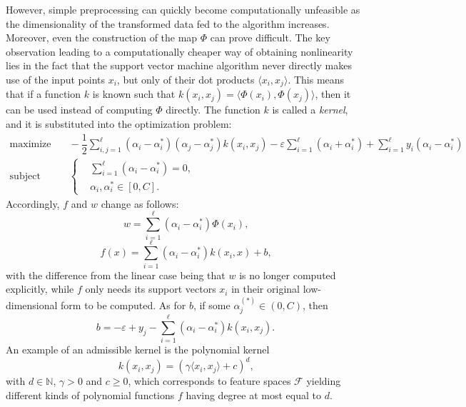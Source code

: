 \documentclass[12pt]{report}
\begin{document}
However, simple preprocessing can quickly become computationally unfeasible as the dimensionality of the transformed data fed to the algorithm increases. Moreover, even the construction of the map $\Phi$ can prove difficult. The key observation leading to a computationally cheaper way of obtaining nonlinearity lies in the fact that the support vector machine algorithm never directly makes use of the input points $ x_{i} $, but only of their dot products $ \langle x_{i},x_{j} \rangle $. This means that if a function $ k $ is known such that $ k(x_{i},x_{j}) = \langle\Phi (x_{i}),\Phi (x_{j})\rangle $, then it can be used instead of computing $ \Phi $ directly. The function $ k $ is called a \textit{kernel}, and it is substituted into the optimization problem:
\begin{equation} \label{kernelsmargdual}
\begin{split}
\text{maximize} &\quad
-\dfrac{1}{2}\sum_{i,j=1}^{\ell}(\alpha_{i} - \alpha_{i}^{*})(\alpha_{j} - \alpha_{j}^{*})k(x_{i},x_{j}) -\varepsilon\sum_{i=1}^{\ell}(\alpha_{i} + \alpha_{i}^{*}) + \sum_{i=1}^{\ell}y_{i}(\alpha_{i}-\alpha_{i}^{*}) \\
\text{subject to} &\quad \left\{\begin{split}
&\sum_{i=1}^{\ell}(\alpha_{i} - \alpha_{i}^{*}) = 0 \text{,}\\
&\alpha_{i},\alpha_{i}^{*} \in [0,C] \text{.}
\end{split}\right.
\end{split}
\end{equation}
Accordingly, $ f $ and $ w $ change as follows:
\begin{equation} \label{wnonlinear}
w = \sum_{i=1}^{\ell}(\alpha_{i}-\alpha_{i}^{*})\Phi(x_{i}) \text{,}
\end{equation}
\begin{equation} \label{kernelfsvexp}
f(x) = \sum_{i=1}^{\ell}(\alpha_{i}-\alpha_{i}^{*})k(x_{i},x) + b \text{,}
\end{equation}
with the difference from the linear case being that $ w $ is no longer computed explicitly, while $ f $ only needs its support vectors $ x_{i} $ in their original low-dimensional form to be computed. As for $b$, if some $\alpha_{j}^{(*)} \in (0,C)$, then
\begin{equation} \label{nonlincompb3}
b = - \varepsilon + y_{j} - \sum_{i=1}^{\ell}(\alpha_{i}-\alpha_{i}^{*})k(x_{i},x_{j}) \text{.}
\end{equation}
An example of an admissible kernel is the polynomial kernel
\begin{equation} \label{polykernel}
k(x_{i},x_{j}) = (\gamma\langle x_{i},x_{j} \rangle + c)^{d} \text{,}
\end{equation}
with $ d \in \mathbb{N} $, $ \gamma > 0 $ and $ c \geq 0 $, which corresponds to feature spaces $ \mathcal{F} $ yielding different kinds of polynomial functions $ f $ having degree at most equal to $d$.
\end{document}

